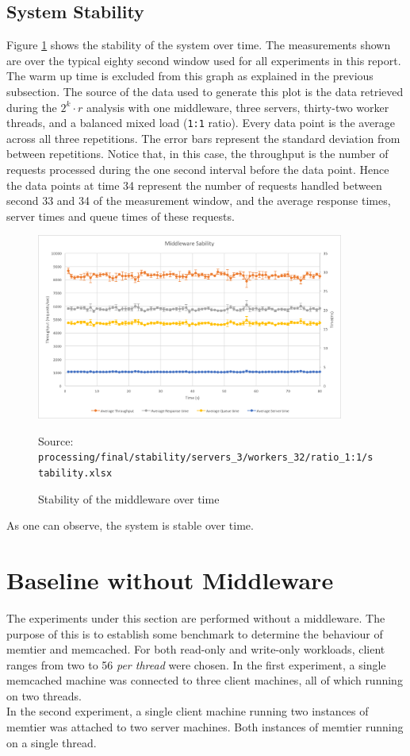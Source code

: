 \documentclass[11pt,a4paper]{article}
\newcommand{\source}[1]{\vspace{-1em}\caption*{\tiny{Source: \texttt{ {#1} }}} }
\begin{document}
\subsection{System Stability}
Figure \ref{png::system_stability} shows the stability of the system over time. The measurements shown are over the typical eighty second window used for all experiments in this report. The warm up time is excluded from this graph as explained in the previous subsection. The source of the data used to generate this plot is the data retrieved during the $2^k\cdot r$ analysis with one middleware, three servers, thirty-two worker threads, and a balanced mixed load (\texttt{1:1} ratio). Every data point is the average across all three repetitions. The error bars represent the standard deviation from between repetitions. Notice that, in this case, the throughput is the number of requests processed during the one second interval before the data point. Hence the data points at time 34 represent the number of requests handled between second 33 and 34 of the measurement window, and the average response times, server times and queue times of these requests.
\begin{figure}[!h]
    \centering
    \includegraphics[width=0.9\textwidth]{processing/graphics/system_stability.png}
    \caption{Stability of the middleware over time}
    \source{processing/final/stability/servers\_3/workers\_32/ratio\_1:1/stability.xlsx}
    \label{png::system_stability}
\end{figure}

As one can observe, the system is stable over time.


\newpage

\section{Baseline without Middleware}
The experiments under this section are performed without a middleware. The purpose of this is to establish some benchmark to determine the behaviour of memtier and memcached. For both read-only and write-only workloads, client ranges from two to 56 \textit{per thread} were chosen. In the first experiment, a single memcached machine was connected to three client machines, all of which running on two threads.\\
In the second experiment, a single client machine running two instances of memtier was attached to two server machines. Both instances of memtier running on a single thread.
\end{document}
